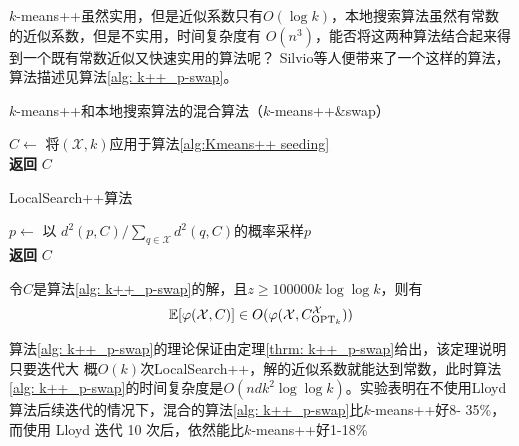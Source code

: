 $k$-means++虽然实用，但是近似系数只有$O(\log k)$，本地搜索算法虽然有常数的近似系数，但是不实用，时间复杂度有
$O(n^3)$，能否将这两种算法结合起来得到一个既有常数近似又快速实用的算法呢？ Silvio等人便带来了一个这样的算法，算法描述见算法\ref{alg: k++_p-swap}。
\begin{algorithm}
    \caption{$k$-means++和本地搜索算法的混合算法（$k$-means++\&swap）}\label{alg: k++_p-swap}
    $C \gets $ 将$(\mathcal{X},k)$应用于算法\ref{alg:Kmeans++ seeding} \\
    \textbf{返回} $C$
\end{algorithm}
\begin{algorithm}
    \caption{LocalSearch++算法}\label{alg: local_search++}
    $p \gets$ 以 $d^2 (p,C)/ \sum_{q \in \mathcal{X}}d^2 (q,C)$的概率采样$p$ \\
    \textbf{返回} $C$
\end{algorithm}
\begin{theorem}
    \label{thrm: k++_p-swap}
     令$C$是算法\ref{alg: k++_p-swap}的解，且$z \geq 100000 k \log\log k$，则有
     \begin{equation*}
         \mathbb{E}[\varphi(\mathcal{X},C)] \in O(\varphi(\mathcal{X},C_{\text{OPT}_k}^{\mathcal{X}}))
     \end{equation*}
\end{theorem}
算法\ref{alg: k++_p-swap}的理论保证由定理\ref{thrm: k++_p-swap}给出，该定理说明只要迭代大
概$O(k)$次LocalSearch++，解的近似系数就能达到常数，此时算法\ref{alg: k++_p-swap}的时间复杂度是$O(ndk^2 \log\log k)$。实验表明在不使用Lloyd 算法后续迭代的情况下，混合的算法\ref{alg: k++_p-swap}比$k$-means++好8-
35\%，而使用 Lloyd 迭代 10 次后，依然能比$k$-means++好1-18\%

